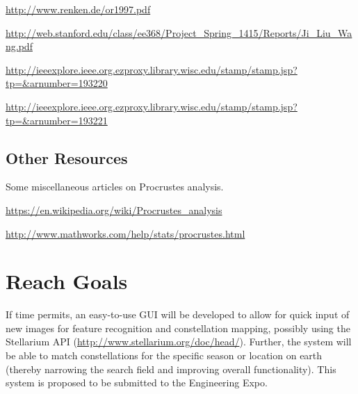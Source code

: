 \documentclass{article}
\begin{document}
\url{http://www.renken.de/or1997.pdf}

\url{http://web.stanford.edu/class/ee368/Project_Spring_1415/Reports/Ji_Liu_Wang.pdf}

\url{http://ieeexplore.ieee.org.ezproxy.library.wisc.edu/stamp/stamp.jsp?tp=&arnumber=193220}

\url{http://ieeexplore.ieee.org.ezproxy.library.wisc.edu/stamp/stamp.jsp?tp=&arnumber=193221}

\subsection{Other Resources}
Some miscellaneous articles on Procrustes analysis.

\url{https://en.wikipedia.org/wiki/Procrustes_analysis}

\url{http://www.mathworks.com/help/stats/procrustes.html}

\section{Reach Goals}
If time permits, an easy-to-use GUI will be developed to allow for quick input of new images for feature recognition and constellation mapping, possibly using the Stellarium API (\url{http://www.stellarium.org/doc/head/}). Further, the system will be able to match constellations for the specific season or location on earth (thereby narrowing the search field and improving overall functionality). This system is proposed to be submitted to the Engineering Expo.
\end{document}
